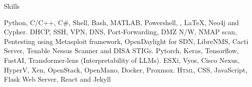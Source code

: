 
\begin{rubric}{Skills}

%	
	Python, C/C++, C\#, Shell, Bash, \textsc{MATLAB}, Powershell, , \LaTeX, Neo4j and Cypher. 
%	
	DHCP, SSH, VPN, DNS, Port-Forwarding, DMZ N/W, NMAP scan, Pentesting using Metasploit framework, OpenDaylight for SDN, LibreNMS, Cacti Server, Tenable Nessus Scanner and DISA STIGs.
%	
	Pytorch, Keras, Tensorflow, FastAI, Transformer-lens (Interpretability of LLMs).
%	
\entry*[Virtualization]
	ESXi, Vyos, Cisco Nexus, HyperV, Xen, OpenStack, OpenMano, Docker, Proxmox.
%	
	\textsc{Html, CSS}, JavaScript, Flask Web Server, React and Jekyll
%
%	
\end{rubric}
